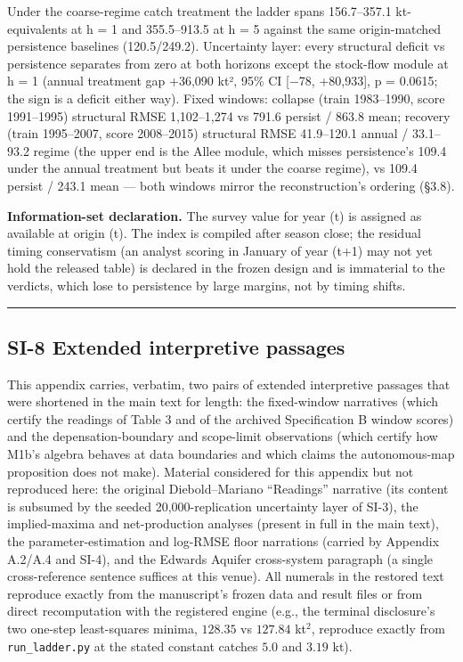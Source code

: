\documentclass[11pt]{article}
\begin{document}
Under the coarse-regime catch treatment the ladder spans 156.7--357.1
kt-equivalents at h = 1 and 355.5--913.5 at h = 5 against the same
origin-matched persistence baselines (120.5/249.2). Uncertainty layer:
every structural deficit vs persistence separates from zero at both
horizons except the stock-flow module at h = 1 (annual treatment gap
+36,090 kt², 95\% CI {[}−78, +80,933{]}, p = 0.0615; the sign is a
deficit either way). Fixed windows: collapse (train 1983--1990, score
1991--1995) structural RMSE 1,102--1,274 vs 791.6 persist / 863.8 mean;
recovery (train 1995--2007, score 2008--2015) structural RMSE
41.9--120.1 annual / 33.1--93.2 regime (the upper end is the Allee
module, which misses persistence's 109.4 under the annual treatment but
beats it under the coarse regime), vs 109.4 persist / 243.1 mean ---
both windows mirror the reconstruction's ordering (§3.8).

\textbf{Information-set declaration.} The survey value for year (t) is
assigned as available at origin (t). The index is compiled after season
close; the residual timing conservatism (an analyst scoring in January
of year (t+1) may not yet hold the released table) is declared in the
frozen design and is immaterial to the verdicts, which lose to
persistence by large margins, not by timing shifts.

\begin{center}\rule{0.5\linewidth}{0.5pt}\end{center}

\subsection{SI-8 Extended interpretive
passages}\label{si-8-extended-interpretive-passages}

This appendix carries, verbatim, two pairs of extended interpretive
passages that were shortened in the main text for length: the
fixed-window narratives (which certify the readings of Table 3 and of
the archived Specification B window scores) and the depensation-boundary
and scope-limit observations (which certify how M1b's algebra behaves at
data boundaries and which claims the autonomous-map proposition does not
make). Material considered for this appendix but not reproduced here:
the original Diebold--Mariano ``Readings'' narrative (its content is
subsumed by the seeded 20,000-replication uncertainty layer of SI-3),
the implied-maxima and net-production analyses (present in full in the
main text), the parameter-estimation and log-RMSE floor narrations
(carried by Appendix A.2/A.4 and SI-4), and the Edwards Aquifer
cross-system paragraph (a single cross-reference sentence suffices at
this venue). All numerals in the restored text reproduce exactly from
the manuscript's frozen data and result files or from direct
recomputation with the registered engine (e.g., the terminal
disclosure's two one-step least-squares minima, \(128.35\) vs \(127.84\)
kt\(^2\), reproduce exactly from \texttt{run\_ladder.py} at the stated
constant catches \(5.0\) and \(3.19\) kt).
\end{document}
